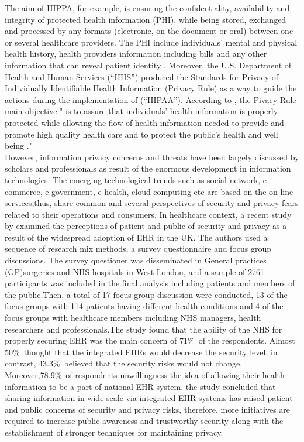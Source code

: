 The aim of HIPPA, for example, is ensuring the confidentiality, availability and integrity of protected health information (PHI), while being stored, exchanged and processed by any formats (electronic, on the document or oral) between one or several healthcare providers. The PHI include individuals' mental and physical health history, health providers information including bills and any other information that can reveal patient identity \cite{U.S.DepartmentofHealthandHumanServices,Rahim2016,Andriole2014a}.
Moreover, the U.S. Department of Health and Human Services (“HHS”) produced the Standards for Privacy of Individually Identifiable Health Information (Privacy Rule) as a way to guide the actions during the implementation of (“HIPAA”). According to \cite{U.S.DepartmentofHealthandHumanServices}, the Pivacy Rule main objective " is to assure that individuals’ health information is properly protected while allowing the flow of health information needed to provide and promote high quality health care and to protect the public's health and well being ."
\\
However, information privacy concerns and threats have been largely discussed by scholars and professionals as result of the enormous development in information technologies. The emerging technological trends such as social network, e-commerce, e-government, e-health, cloud computing etc are based on the on line services,thus, share common and several perspectives of security and privacy fears related to their operations and consumers. In healthcare context, a recent study by \citet{Papoutsi2015} examined the perceptions of patient and public of security and privacy as a result of the widespread adoption of EHR in the UK. The authors used a sequence of research mix methods, a survey questionnaire and focus group discussions. The survey questioner was disseminated in General practices (GP)surgeries and NHS hospitals in West London, and a sample of 2761 participants was included in the final analysis including patients and members of the public.Then, a total of 17 focus group discussion were conducted, 13 of the focus groups with 114 patients having different health conditions and 4 of the focus groups with healthcare members including NHS managers, health researchers and professionals.The study found that the ability of the NHS for properly securing EHR was the main concern of 71\%\ of the respondents.  Almost 50\%\ thought that the integrated EHRs would decrease the security level, in contrast, 43.3\%\ believed that the security risks would not change. Moreover,78.9\%\ of respondents unwillingness the idea of allowing their health information to be a part of national EHR system. \citet{Papoutsi2015} the study concluded that sharing information in wide scale via integrated EHR systems has raised patient and public concerns of security and privacy risks, therefore, more initiatives are required to increase public awareness and trustworthy security along with the establishment of stronger techniques for maintaining privacy.

